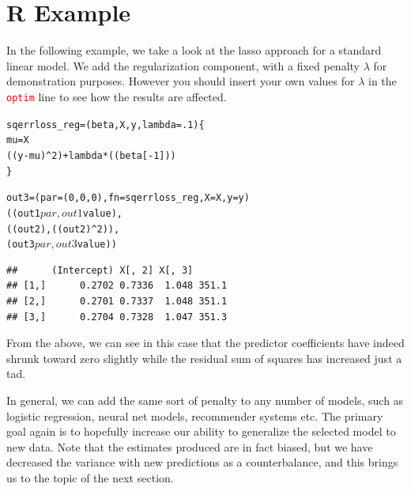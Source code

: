 \documentclass[english,nohyper,titlepage]{tufte-handout}
\begin{document}
\section{R Example}
In the following example, we take a look at the lasso approach for a standard linear model.  We add the regularization component, with a fixed penalty $\lambda$ for demonstration purposes.  However you should insert your own values for $\lambda$ in the \texttt{\textcolor{red}{optim}} line to see how the results are affected. 

\vspace{.25cm}
\begin{knitrout}\footnotesize
{}\color{fgcolor}\begin{kframe}
\begin{alltt}
sqerrloss_reg = (beta, X, y, lambda=.1)\{
  mu = X%
  ((y-mu)^2) + lambda*((beta[-1]))
\}

out3 = (par=(0,0,0), fn=sqerrloss_reg, X=X, y=y)
((out1$par, out1$value), 
      ((out2),((out2)^2)), 
      (out3$par, out3$value) )
\end{alltt}
\begin{verbatim}
##      (Intercept) X[, 2] X[, 3]      
## [1,]      0.2702 0.7336  1.048 351.1
## [2,]      0.2701 0.7337  1.048 351.1
## [3,]      0.2704 0.7328  1.047 351.3
\end{verbatim}
\end{kframe}
\end{knitrout}


From the above, we can see in this case that the predictor coefficients have indeed shrunk toward zero slightly while the residual sum of squares has increased just a tad.

In general, we can add the same sort of penalty to any number of models, such as logistic regression, neural net models, recommender systems etc.  The primary goal again is to hopefully increase our ability to generalize the selected model to new data.  Note that the estimates produced are in fact biased, but we have decreased the variance with new predictions as a counterbalance, and this brings us to the topic of the next section.



\end{document}
